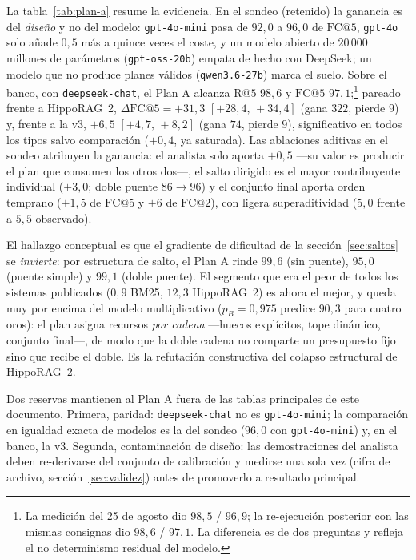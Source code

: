 \documentclass[11pt,a4paper]{article}
\newcommand{\hippo}{HippoRAG~2}
\begin{document}
La tabla~\ref{tab:plan-a} resume la evidencia. En el sondeo (retenido) la
ganancia es del \emph{diseño} y no del modelo: \texttt{gpt-4o-mini} pasa
de $92{,}0$ a $96{,}0$ de $\mathrm{FC@}5$, \texttt{gpt-4o} solo añade
$0{,}5$ más a quince veces el coste, y un modelo abierto de $20\,000$
millones de parámetros (\texttt{gpt-oss-20b}) empata de hecho con
DeepSeek; un modelo que no produce planes válidos (\texttt{qwen3.6-27b})
marca el suelo. Sobre el banco, con \texttt{deepseek-chat}, el Plan A
alcanza $\mathrm{R@}5$ $98{,}6$ y $\mathrm{FC@}5$ $97{,}1$;\footnote{La
medición del 25 de agosto dio $98{,}5$ / $96{,}9$; la re-ejecución
posterior con las mismas consignas dio $98{,}6$ / $97{,}1$. La
diferencia es de dos preguntas y refleja el no determinismo residual del
modelo.} pareado frente a \hippo{}, $\Delta\mathrm{FC@}5=+31{,}3$
$[+28{,}4,\,+34{,}4]$ (gana $322$, pierde $9$) y, frente a la v3,
$+6{,}5$ $[+4{,}7,\,+8{,}2]$ (gana $74$, pierde $9$), significativo en
todos los tipos salvo comparación ($+0{,}4$, ya saturada). Las
ablaciones aditivas en el sondeo atribuyen la ganancia: el analista solo
aporta $+0{,}5$ ---su valor es producir el plan que consumen los otros
dos---, el salto dirigido es el mayor contribuyente individual
($+3{,}0$; doble puente $86 \to 96$) y el conjunto final aporta orden
temprano ($+1{,}5$ de $\mathrm{FC@}5$ y $+6$ de $\mathrm{FC@}2$), con
ligera superaditividad ($5{,}0$ frente a $5{,}5$ observado).

El hallazgo conceptual es que el gradiente de dificultad de la
sección~\ref{sec:saltos} se \emph{invierte}: por estructura de salto, el
Plan A rinde $99{,}6$ (sin puente), $95{,}0$ (puente simple) y $99{,}1$
(doble puente). El segmento que era el peor de todos los sistemas
publicados ($0{,}9$ BM25, $12{,}3$ \hippo{}) es ahora el mejor, y queda
muy por encima del modelo multiplicativo ($p_B=0{,}975$ predice $90{,}3$
para cuatro oros): el plan asigna recursos \emph{por cadena} ---huecos
explícitos, tope dinámico, conjunto final---, de modo que la doble
cadena no comparte un presupuesto fijo sino que recibe el doble. Es la
refutación constructiva del colapso estructural de \hippo{}.

Dos reservas mantienen al Plan A fuera de las tablas principales de este
documento. Primera, paridad: \texttt{deepseek-chat} no es
\texttt{gpt-4o-mini}; la comparación en igualdad exacta de modelos es la
del sondeo ($96{,}0$ con \texttt{gpt-4o-mini}) y, en el banco, la v3.
Segunda, contaminación de diseño: las demostraciones del analista deben
re-derivarse del conjunto de calibración y medirse una sola vez
(\guillemotleft{}cifra de archivo\guillemotright{}, sección~\ref{sec:validez}) antes de
promoverlo a resultado principal.
\end{document}
